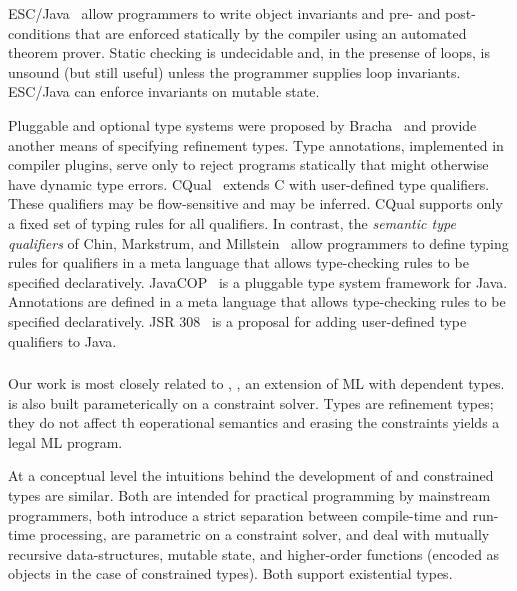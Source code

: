 ESC/Java~\cite{esc-java}
allow programmers to write object invariants and pre- and
post-conditions that are enforced statically
by the compiler using an automated theorem prover.
Static checking is undecidable and, in the presense of loops,
is unsound (but still useful) unless the programmer supplies loop invariants.
ESC/Java can enforce invariants on mutable state.


Pluggable and optional type systems were proposed by
Bracha~\cite{bracha04-pluggable} and provide another means of
specifying refinement types.
Type annotations, implemented in compiler plugins, serve only to
reject programs statically that might otherwise have dynamic
type errors.
CQual~\cite{foster-popl02} extends C with user-defined type
qualifiers.  These
qualifiers may be flow-sensitive and may be inferred. 
CQual supports only a fixed set of typing rules
for all qualifiers.
In contrast, the {\em semantic type qualifiers} of
Chin, Markstrum, and Millstein~\cite{chin05-qualifiers}
allow programmers to define typing rules for qualifiers
in a meta language that allows type-checking rules to be
specified declaratively.
JavaCOP~\cite{javacop-oopsla06} is a pluggable type system
framework for Java.  Annotations are defined in a meta language
that allows type-checking rules to be specified declaratively.
JSR 308~\cite{jsr308} is a proposal for adding user-defined type qualifiers
to Java.



\subsubsection{\DML}
Our work is most closely related to \DML{}, \cite{xi99dependent}, an
extension of ML with dependent types. \DML{} is also built
parameterically on a constraint solver. Types are refinement types;
they do not affect th eoperational semantics and erasing the
constraints yields a legal ML program.

At a conceptual level the intuitions behind the development of \DML{}
and constrained types are similar. Both are intended for practical
programming by mainstream programmers, both introduce a strict
separation between compile-time and run-time processing, are
parametric on a constraint solver, and deal with mutually recursive
data-structures, mutable state, and higher-order functions (encoded as
objects in the case of constrained types). Both support existential
types.

